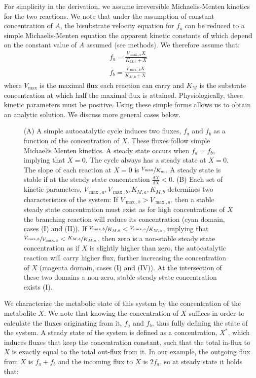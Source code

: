 For simplicity in the derivation, we assume irreversible Michaelis-Menten kinetics for the two reactions.
We note that under the assumption of constant concentration of $A$, the bisubstrate velocity equation for $f_a$ can be reduced to a simple Michaelis-Menten equation the apparent kinetic constants of which depend on the constant value of $A$ assumed (see methods).
We therefore assume that:
    \begin{eqnarray*}
      f_a = \frac{V_{\max,a}X}{K_{M,a}+X} \\
      f_b = \frac{V_{\max,b}X}{K_{M,b}+X}
    \end{eqnarray*}
    where $V_{\max}$ is the maximal flux each reaction can carry and $K_M$ is the substrate concentration at which half the maximal flux is attained.
    Physiologically, these kinetic parameters must be positive.
    Using these simple forms allows us to obtain an analytic solution.
    We discuss more general cases below.
    \begin{figure}[!htb]
      
      \caption{\label{fig:simplecycle}
        (A) A simple autocatalytic cycle induces two fluxes, $f_a$ and $f_b$ as a function of the concentration of $X$.
        These fluxes follow simple Michaelis Menten kinetics.
        A steady state occurs when $f_a=f_b$, implying that $\dot{X}=0$.
        The cycle always has a steady state at $X=0$.
        The slope of each reaction at $X=0$ is $\sfrac{V_{\max}}{K_m}$.
        A steady state is stable if at the steady state concentration $\frac{d\dot{X}}{dX}<0$.
        (B) Each set of kinetic parameters, $V_{\max,a},V_{\max,b},K_{M,a},K_{M,b}$ determines two characteristics of the system: 
        If $V_{\max,b}>V_{\max,a}$, then a stable steady state concentration must exist as for high concentrations of $X$ the branching reaction will reduce its concentration (cyan domain, cases (I) and (II)).
        If $\sfrac{V_{\max,b}}{K_{M,b}}<\sfrac{V_{\max,a}}{K_{M,a}}$, implying that $\sfrac{V_{\max,b}}{V_{\max,a}}<\sfrac{K_{M,b}}{K_{M,a}}$, then zero is a non-stable steady state concentration as if $X$ is slightly higher than zero, the autocatalytic reaction will carry higher flux, further increasing the concentration of $X$ (magenta domain, cases (I) and (IV)).
    At the intersection of these two domains a non-zero, stable steady state concentration exists (I).}
    \end{figure}

    We characterize the metabolic state of this system by the concentration of the metabolite $X$.
    We note that knowing the concentration of $X$ suffices in order to calculate the fluxes originating from it, $f_a$ and $f_b$, thus fully defining the state of the system.
    A steady state of the system is defined as a concentration, $X^*$, which induces fluxes that keep the concentration constant, such that the total in-flux to $X$ is exactly equal to the total out-flux from it.
    In our example, the outgoing flux from $X$ is $f_a+f_b$ and the incoming flux to $X$ is $2f_a$, so at steady state it holds that:

